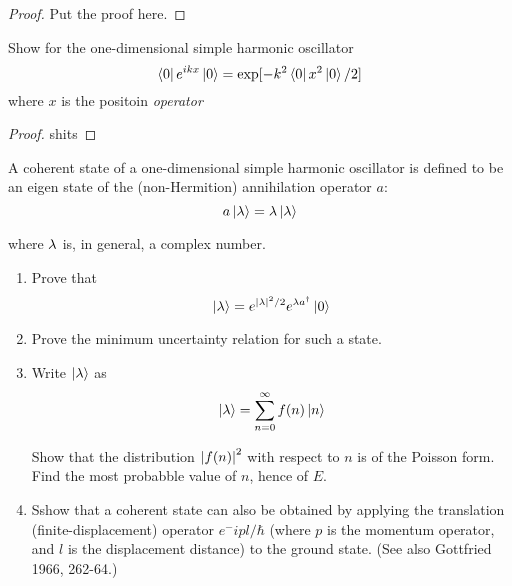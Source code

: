 \begin{proof}

    Put the proof here.

\end{proof}


\begin{exer}[2.18]

    Show for the one-dimensional simple harmonic oscillator
    \[
        \left< 0 \right| e^{ikx} \left| 0 \right> = \exp[- k^2 \left< 0 \right| x^2 \left| 0 \right> / 2]
    \]
    where $x$ is the positoin \it{operator}
    
\end{exer}

\begin{proof}

    shits

\end{proof}


\begin{exer}[2.19]

    A coherent state of a one-dimensional simple harmonic oscillator is
    defined to be an eigen state of the (non-Hermition) annihilation
    operator $a$:
    \[
        a\left| \lambda \right> = \lambda \left| \lambda \right>
    \]
    
    where $\lambda$ is, in general, a complex number.
    \begin{enumerate}
        \item Prove that 
            \[
                \left| \lambda \right> = e^{\left| \lambda \right|^2 / 2} e^{\lambda
                a^\dagger} \left| 0 \right>
            \]

        \item Prove the minimum uncertainty relation for such a state.

        \item Write $\left| \lambda \right>$ as 
            \[
                \left| \lambda \right> = \sum^{\infty}_{n = 0} f(n) \left| n \right>
            \]

            Show that the distribution $\left| f(n) \right|^2$ with respect to
            $n$ is of the Poisson form. Find the most probabble value of
            $n$, hence of $E$.

        \item Sshow that a coherent state can also be obtained by
            applying the translation (finite-displacement) operator
            $e^-ipl/\hbar$ (where $p$ is the momentum operator, and
            $l$ is the displacement distance) to the ground state. (See
            also Gottfried 1966, 262-64.)

    \end{enumerate}
\end{exer}

